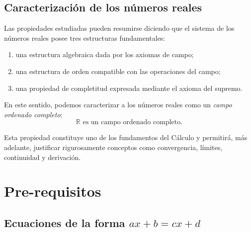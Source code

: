 \documentclass[12pt]{article}
\begin{document}
\subsection*{Caracterización de los números reales}

Las propiedades estudiadas pueden resumirse diciendo que el sistema de
los números reales posee tres estructuras fundamentales:

\begin{enumerate}
    \item una estructura algebraica dada por los axiomas de campo;

    \item una estructura de orden compatible con las operaciones del campo;

    \item una propiedad de completitud expresada mediante el axioma del
    supremo.
\end{enumerate}

En este sentido, podemos caracterizar a los números reales como un
\emph{campo ordenado completo}:
\[
\boxed{
\mathbb{R}\text{ es un campo ordenado completo}.
}
\]

Esta propiedad constituye uno de los fundamentos del Cálculo y permitirá,
más adelante, justificar rigurosamente conceptos como convergencia,
límites, continuidad y derivación.

\section{Pre-requisitos}\label{pre-requisitos}

\subsection{\texorpdfstring{Ecuaciones de la forma
\(ax+b=cx+d\)}{Ecuaciones de la forma ax+b=cx+d}}\label{ecuaciones-de-la-forma-axbcxd}
\end{document}

